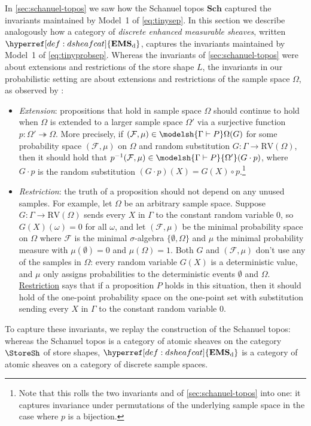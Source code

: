 \documentclass[
  sigconf,
  screen, ]{acmart}
\makeatletter
\theoremstyle{definition}
\newcommand\calF{\mathcal F}
\newcommand{\labelword}[2]{\phantomsection
  #1\def\@currentlabel{\unexpanded{#1}}\label{#2}}
\newcommand\nref[2]{\hyperref[#1]{#2}} \newcommand\checkhigh{{\huge{\color{red}\textbf{TODO: check}}}}
\newcommand\sheafcatadj{enhanced measurable}
\newcommand\goodsheafcat{\mathbf{EMS}}
\newcommand\dgoodsheaves{discrete \sheafcatadj{} sheaves}
\newcommand\Sch{{\nref{def:Sch}{\mathbf{Sch}}}}
\newcommand\discsubscript{_{\rm d}}
\newcommand\DRV{{\nref{prop:dwarp-in-the-atomic-sheaves}{\mathrm{RV}}}}
\newcommand\dsheafcat{{\nref{def:dsheafcat}{\goodsheafcat\discsubscript}}}
\newcommand\RV{\mathrm{RV}}
\makeatother
\begin{document}
In \cref{sec:schanuel-topos} we saw how the Schanuel topos $\Sch$
captured the invariants maintained by Model~1 of \ref{eq:tinysep}.
In this section we describe analogously how
a category of \emph{\dgoodsheaves},
written $\dsheafcat$,
captures the invariants maintained by Model~1 of \ref{eq:tinyprobsep}.
Whereas the invariants of \cref{sec:schanuel-topos}
were about extensions and restrictions of the store shape $L$,
the invariants in our probabilistic setting
are about extensions and restrictions of the sample space $\Omega$,
as observed by \citet{simpson2017probability,simpsonsheafslides}:
\newcommand\probExtension{\nref{def:probExtension}{Extension}}
\newcommand\probRestriction{\nref{def:probRestriction}{Restriction}}
\begin{itemize}[leftmargin=*]
  \item \emph{\labelword{Extension}{def:probExtension}}:
    propositions that hold in sample space $\Omega$
    should continue to hold when $\Omega$
    is extended to a larger sample space $\Omega'$
    via a surjective function $p : \Omega'\twoheadrightarrow\Omega$.
    More precisely, if $(\calF,\mu)\in\modelsh{\Gamma\vdash P}\Omega(G)$
    for some probability space $(\calF,\mu)$ on $\Omega$
    and random substitution $G : \Gamma\to\DRV(\Omega)$,
    then it should hold that $p^{-1}(\calF,\mu) \in \modelsh{\Gamma\vdash P}{\Omega'}(G\cdot p)$,
    where $G\cdot p$ is the random substitution
    $(G\cdot p)(X) = G(X)\circ p$.\footnote{Note that this rolls the two invariants \Extension{} and \Renaming{}
    of \cref{sec:schanuel-topos} into one: it captures invariance under
    permutations of the underlying sample space in the case where $p$
    is a bijection.}

  \item \emph{\labelword{Restriction}{def:probRestriction}}:
    the truth of a proposition should not depend on any unused samples.
    For example, let $\Omega$ be an arbitrary sample space.
    Suppose $G : \Gamma\to\RV(\Omega)$
    sends every $X$ in $\Gamma$
    to the constant random variable $0$, so
    $G(X)(\omega) = 0$ for all $\omega$,
    and let $(\calF,\mu)$ be the minimal probability space on $\Omega$
    where $\calF$ is the minimal $\sigma$-algebra $\{\emptyset,\Omega\}$
    and $\mu$ the minimal probability measure with $\mu(\emptyset) = 0$
    and $\mu(\Omega) = 1$.
    Both $G$ and $(\calF,\mu)$
    don't use any of the samples in $\Omega$: every random variable $G(X)$ 
    is a deterministic value, and $\mu$ only assigns probabilities to
    the deterministic events $\emptyset$ and $\Omega$.
    \probRestriction{} says that if a proposition $P$ holds in this situation,
    then it should hold of the one-point probability space
    on the one-point set with substitution
    sending every $X$ in $\Gamma$ to the constant random variable $0$.
\end{itemize}
To capture these invariants, we replay the construction of the Schanuel topos:
whereas the Schanuel topos is a category of atomic sheaves on the category $\StoreSh$
of store shapes, $\dsheafcat$ is a category of atomic sheaves
on a category of discrete sample spaces.
\end{document}
